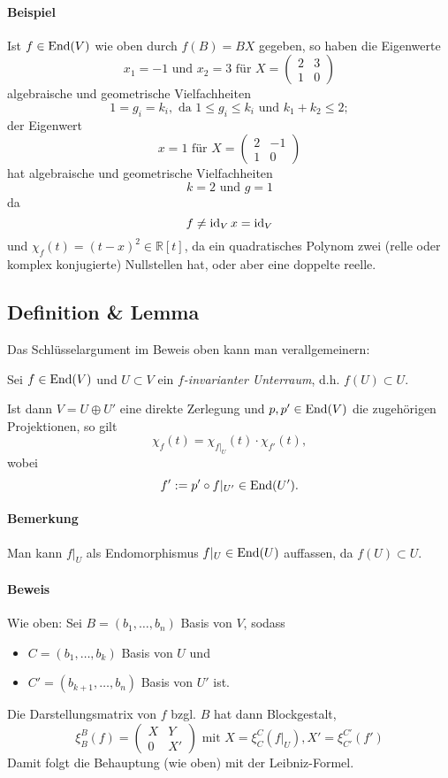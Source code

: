 \paragraph{Beispiel}
	Ist $ f\in\operatorname{End}(V) $ wie oben durch $ f(B)=BX $ gegeben, so haben die Eigenwerte
		\[ x_1 = -1 \text{ und } x_2 = 3 \text{ für }
		X=\begin{pmatrix} 2 &3\\1 & 0 \end{pmatrix} \]
	algebraische und geometrische Vielfachheiten 
		\[ 1 = g_i = k_i, \text{ da } 1\leq g_i \leq k_i \text{ und } k_1+k_2 \leq 2; \]
	der Eigenwert
		\[ x=1 \text{ für } X = \begin{pmatrix} 2&-1\\1&0 \end{pmatrix} \]
	hat algebraische und geometrische Vielfachheiten
		\[ k = 2 \text{ und } g = 1 \]
	da
		\[ f\neq \operatorname{id}_V x = \operatorname{id}_V \]
	und $ \chi_f(t)=(t-x)^2 \in \mathbb{R}[t] $, da ein quadratisches Polynom zwei (relle oder komplex konjugierte) Nullstellen hat, oder aber eine doppelte reelle.

\subsection{Definition \& Lemma}
	Das Schlüsselargument im Beweis oben kann man verallgemeinern:

\begin{Definition}
	Sei $ f\in \operatorname{End}(V) $ und $ U\subset V $ ein \emph{$ f $-invarianter Unterraum}, d.h. $ f(U)\subset U $. 

\end{Definition}
\begin{Lemma}[]
	Ist dann $ V=U\oplus U' $ eine direkte Zerlegung und $ p,p'\in \operatorname{End}(V) $ die zugehörigen Projektionen, so gilt
		\[ \chi_f(t)=\chi_{f|_U}(t)\cdot \chi_{f'}(t), \]
	wobei
		\[ f':= p'\circ f|_{U'}\in \operatorname{End}(U'). \]

\end{Lemma}
\paragraph{Bemerkung}
	Man kann $ f|_U $ als Endomorphismus $ f|_U\in \operatorname{End}(U) $ auffassen, da $ f(U)\subset U $.
\paragraph{Beweis}
	Wie oben: Sei $ B=(b_1,\dots,b_n) $ Basis von $ V $, sodass
		\begin{itemize}
			\item $ C=(b_1,\dots,b_k) $ Basis von $ U $ und
			\item $ C'=(b_{k+1},\dots,b_n) $ Basis von $ U' $ ist.
		\end{itemize}
	Die Darstellungsmatrix von $ f $ bzgl. $ B $ hat dann Blockgestalt,
		\[ \xi_B^B(f) =
			\begin{pmatrix}
				X&Y\\0&X'
			\end{pmatrix}
		\text{ mit } X=\xi_C^C(f|_U), X' = \xi_{C'}^{C'}(f') \]
	Damit folgt die Behauptung (wie oben) mit der Leibniz-Formel.
